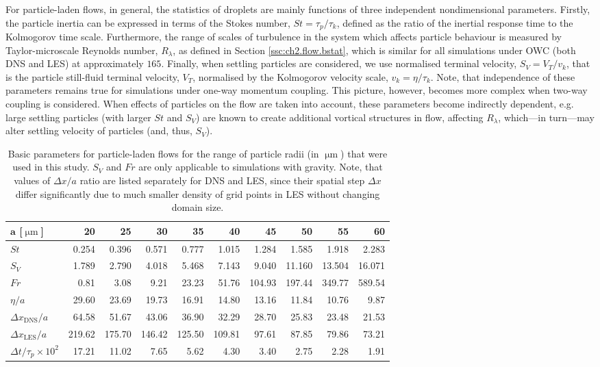 \documentclass{pracamgren}
\begin{document}
For particle-laden flows, in general, the statistics of droplets are mainly functions of three independent nondimensional parameters.
Firstly, the particle inertia can be expressed in terms of the Stokes number, $St = \tau_p / \tau_k$, defined as the ratio of the inertial response time to the
Kolmogorov time scale.
Furthermore, the range of scales of turbulence in the system which affects particle behaviour is measured by Taylor-microscale Reynolds number, $R_{\lambda}$, as defined in Section \ref{ssc:ch2.flow.bstat}, which is similar for all simulations under OWC (both DNS and LES) at approximately $165$.
Finally, when settling particles are considered, we use normalised terminal velocity, $S_V = V_T / v_k$, that is the particle still-fluid terminal velocity, $V_T$, normalised by the Kolmogorov velocity scale, $v_k = \eta / \tau_k$.
Note, that independence of these parameters remains true for simulations under one-way momentum coupling.
This picture, however, becomes more complex when two-way coupling is considered.
When effects of particles on the flow are taken into account, these parameters become indirectly dependent, e.g. large settling particles (with larger $St$ and $S_V$) are known to create additional vortical structures in flow, affecting $R_{\lambda}$, which---in turn---may alter settling velocity of particles (and, thus, $S_V$).

\begin{table}[h]
\centering
\small
\begin{tabular}{lrrrrrrrrr}
$\mathbf{a}$ [$\upmu\text{m}$] & 20 & 25 & 30 & 35 & 40 & 45 & 50 & 55 & 60  \\ \hline
$St$ & 0.254 & 0.396 & 0.571 & 0.777 & 1.015 & 1.284 & 1.585 & 1.918 & 2.283 \\
$S_V$ & 1.789 & 2.790 & 4.018 & 5.468 & 7.143 & 9.040 & 11.160 & 13.504 & 16.071 \\
$Fr$ & 0.81 & 3.08 & 9.21 & 23.23 & 51.76 & 104.93 & 197.44 & 349.77 & 589.54 \\
$\eta / a$ & 29.60 & 23.69 & 19.73 & 16.91 & 14.80 & 13.16 & 11.84 & 10.76 & 9.87 \\
$\Delta x_{\text{DNS}} / a$ & 64.58 & 51.67 & 43.06 & 36.90 & 32.29 & 28.70 & 25.83 & 23.48 & 21.53 \\
$\Delta x_{\text{LES}} / a$ & 219.62 & 175.70 & 146.42 & 125.50 & 109.81 & 97.61 & 87.85 & 79.86 & 73.21 \\
$\Delta t / \tau_p \times 10^2$ & 17.21 & 11.02 & 7.65 & 5.62 & 4.30 & 3.40 & 2.75 & 2.28 & 1.91 \\ \hline
\end{tabular}
\caption{Basic parameters for particle-laden flows for the range of particle radii (in $\upmu\text{m}$) that were used in this study.
$S_V$ and $Fr$ are only applicable to simulations with gravity.
Note, that values of $\Delta x / a$ ratio are listed separately for DNS and LES, since their spatial step $\Delta x$ differ significantly due to much smaller density of grid points in LES without changing domain size. }
\label{tab:part-stats}
\end{table}
\end{document}
